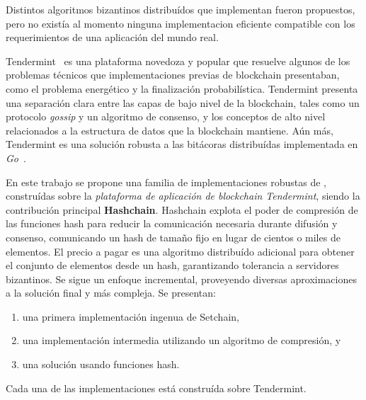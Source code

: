 %

Distintos algoritmos bizantinos distribuídos que implementan \setchain fueron
propuestos, pero no existía al momento ninguna implementacion eficiente compatible con
los requerimientos de una aplicación del mundo real.



Tendermint~\cite{Buchman.2018.Tendermint} es una plataforma novedoza y popular que resuelve
algunos de los problemas técnicos que implementaciones previas de blockchain presentaban,
como el problema energético y la finalización probabilística.
%
Tendermint presenta una separación clara entre las capas de bajo nivel de la blockchain,
tales como un protocolo \textit{gossip} y un algoritmo de consenso, y los conceptos de alto
nivel relacionados a la estructura de datos que la blockchain mantiene.
%
Aún más, Tendermint es una solución robusta a las bitácoras distribuídas implementada
en \emph{Go}~\cite{donovan15go}.

%

%
%
En este trabajo se propone una familia de implementaciones robustas de \setchain,
construídas sobre la \emph{plataforma de aplicación de blockchain Tendermint},
siendo la contribución principal \textbf{Hashchain}.
%
Hashchain explota el poder de compresión de las funciones hash para reducir la
comunicación necesaria durante difusión y consenso, comunicando un hash de tamaño
fijo en lugar de cientos o miles de elementos.
%
El precio a pagar es una algoritmo distribuído adicional para obtener el conjunto de
elementos desde un hash, garantizando tolerancia a servidores bizantinos.
%
Se sigue un enfoque incremental, proveyendo diversas aproximaciones a la solución
final y más compleja. Se presentan:
\begin{enumerate}
  \item una primera implementación ingenua de Setchain,
  \item una implementación intermedia utilizando un algoritmo de compresión, y
  \item una solución usando funciones hash.
\end{enumerate}
%
%
Cada una de las implementaciones está construída sobre Tendermint.



